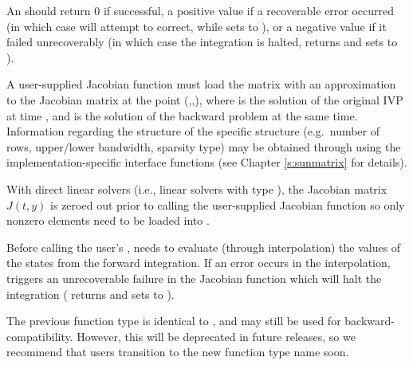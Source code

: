 {
  An  should return 0 if successful, a positive value if a recoverable
  error occurred (in which case {\idas} will attempt to correct, while {\idals} sets
   to ), or a negative
  value if it failed unrecoverably (in which case the integration is halted, 
  returns  and {\idals} sets  to
  ).
}
{
  A user-supplied Jacobian function must load the
  matrix  with an approximation to the Jacobian matrix
  at the point (,,), where  is the solution
  of the original IVP at time , and  is the solution of the
  backward problem at the same time.
  Information regarding the structure of the specific {\sunmatrix}
  structure (e.g.~number of rows, upper/lower bandwidth, sparsity
  type) may be obtained through using the implementation-specific
  {\sunmatrix} interface functions (see Chapter \ref{s:sunmatrix} for
  details).

  With direct linear solvers (i.e., linear solvers with type
  ), the Jacobian matrix $J(t,y)$ is zeroed out
  prior to calling the user-supplied Jacobian function so only nonzero elements
  need to be loaded into .

  {\warn}Before calling the user's , {\idas} needs to evaluate
  (through interpolation) the values of the states from the forward integration.
  If an error occurs in the interpolation, {\idas} triggers an unrecoverable
  failure in the Jacobian function which will halt the integration
  ( returns  and {\idals} sets  to
  ).

  The previous function type  is identical to
  , and may still be used for backward-compatibility.
  However, this will be deprecated in future releases, so we recommend
  that users transition to the new function type name soon.
}

